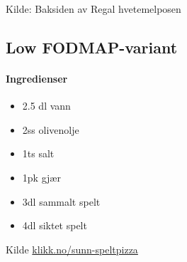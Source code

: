 

Kilde: Baksiden av Regal hvetemelposen

\subsection{Low FODMAP-variant}

\paragraph{Ingredienser}
\begin{itemize}[noitemsep]
	\item 2.5 dl vann
	\item 2ss olivenolje
	\item 1ts salt
	\item 1pk gjær
	\item 3dl sammalt spelt
	\item 4dl siktet spelt
\end{itemize}



Kilde \href{http://oppskrift.klikk.no/sunn-speltpizza/2795/f}{klikk.no/sunn-speltpizza}
